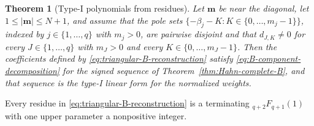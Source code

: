 \documentclass[10pt]{amsart}
\newcommand{\mm}{\boldsymbol m}
\newcommand{\abs}[1]{\lvert#1\rvert}
\theoremstyle{plain}
\newtheorem{theorem}{Theorem}[section]
\theoremstyle{definition}
\theoremstyle{remark}
\begin{document}
\begin{theorem}[Type-I polynomials from residues]
\label{thm:Hahn-B-components}
Let \(\mm\) be near the diagonal, let \(1\le\abs\mm\le N+1\), and assume
that the pole sets
\(\{-\beta_j-K:K\in\{0,\ldots,m_j-1\}\}\), indexed by
\(j\in\{1,\ldots,q\}\) with \(m_j>0\), are pairwise disjoint and that
\(d_{J,K}\ne0\) for every \(J\in\{1,\ldots,q\}\) with \(m_J>0\) and
every \(K\in\{0,\ldots,m_J-1\}\). Then the coefficients
defined by \eqref{eq:triangular-B-reconstruction} satisfy
\eqref{eq:B-component-decomposition} for the signed sequence of
Theorem~\ref{thm:Hahn-complete-B}, and that sequence is the type-I linear
form for the normalized weights.
\end{theorem}

Every residue in \eqref{eq:triangular-B-reconstruction} is a terminating
\({}_{q+2}F_{q+1}(1)\) with one upper parameter a nonpositive integer.
\end{document}
